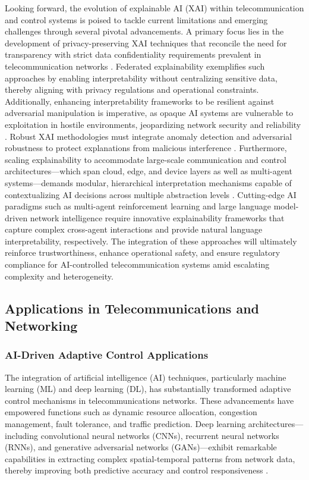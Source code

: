 \documentclass[sigconf]{acmart}
\begin{document}
Looking forward, the evolution of explainable AI (XAI) within telecommunication and control systems is poised to tackle current limitations and emerging challenges through several pivotal advancements. A primary focus lies in the development of privacy-preserving XAI techniques that reconcile the need for transparency with strict data confidentiality requirements prevalent in telecommunication networks \cite{ref48}. Federated explainability exemplifies such approaches by enabling interpretability without centralizing sensitive data, thereby aligning with privacy regulations and operational constraints. Additionally, enhancing interpretability frameworks to be resilient against adversarial manipulation is imperative, as opaque AI systems are vulnerable to exploitation in hostile environments, jeopardizing network security and reliability \cite{ref50}. Robust XAI methodologies must integrate anomaly detection and adversarial robustness to protect explanations from malicious interference \cite{ref54}. Furthermore, scaling explainability to accommodate large-scale communication and control architectures—which span cloud, edge, and device layers as well as multi-agent systems—demands modular, hierarchical interpretation mechanisms capable of contextualizing AI decisions across multiple abstraction levels \cite{ref55}. Cutting-edge AI paradigms such as multi-agent reinforcement learning and large language model-driven network intelligence require innovative explainability frameworks that capture complex cross-agent interactions and provide natural language interpretability, respectively. The integration of these approaches will ultimately reinforce trustworthiness, enhance operational safety, and ensure regulatory compliance for AI-controlled telecommunication systems amid escalating complexity and heterogeneity.

\subsection{Applications in Telecommunications and Networking}

\subsubsection{AI-Driven Adaptive Control Applications}

The integration of artificial intelligence (AI) techniques, particularly machine learning (ML) and deep learning (DL), has substantially transformed adaptive control mechanisms in telecommunications networks. These advancements have empowered functions such as dynamic resource allocation, congestion management, fault tolerance, and traffic prediction. Deep learning architectures---including convolutional neural networks (CNNs), recurrent neural networks (RNNs), and generative adversarial networks (GANs)---exhibit remarkable capabilities in extracting complex spatial-temporal patterns from network data, thereby improving both predictive accuracy and control responsiveness \cite{ref1,ref2,ref3,ref4,ref5,ref6,ref7,ref10,ref11,ref14,ref50}.
\end{document}
